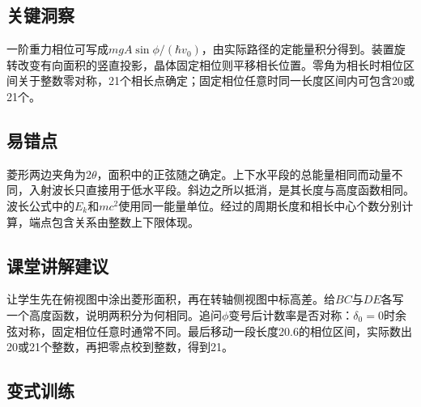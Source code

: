 \documentclass[UTF8,fontset=fandol,a4paper,11pt]{ctexart}
\begin{document}


\subsection*{关键洞察}

一阶重力相位可写成$mgA\sin\phi/(\hbar v_0)$，由实际路径的定能量积分得到。装置旋转改变有向面积的竖直投影，晶体固定相位则平移相长位置。零角为相长时相位区间关于整数零对称，21个相长点确定；固定相位任意时同一长度区间内可包含20或21个。



\subsection*{易错点}

菱形两边夹角为$2\theta$，面积中的正弦随之确定。上下水平段的总能量相同而动量不同，入射波长只直接用于低水平段。斜边之所以抵消，是其长度与高度函数相同。波长公式中的$E_k$和$mc^2$使用同一能量单位。经过的周期长度和相长中心个数分别计算，端点包含关系由整数上下限体现。



\subsection*{课堂讲解建议}

让学生先在俯视图中涂出菱形面积，再在转轴侧视图中标高差。给$BC$与$DE$各写一个高度函数，说明两积分为何相同。追问$\phi$变号后计数率是否对称：$\delta_0=0$时余弦对称，固定相位任意时通常不同。最后移动一段长度20.6的相位区间，实际数出20或21个整数，再把零点校到整数，得到21。



\subsection*{变式训练}
\end{document}
